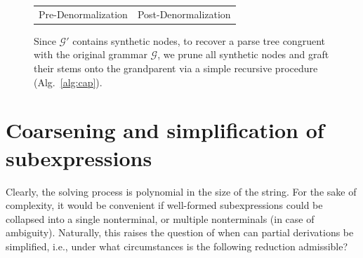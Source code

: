 \documentclass[sigplan,review,anonymous,acmsmall]{acmart}\settopmatter{printfolios=false,printccs=false,printacmref=false}
\begin{document}
\begin{figure}[H]
{\begin{tabular}{ll}
        \hspace{1cm}\Huge{Pre-Denormalization} & \hspace{2cm}\Huge{Post-Denormalization}
    \end{tabular}
  }
  \caption{Since $\mathcal{G}'$ contains synthetic nodes, to recover a parse tree congruent with the original grammar $\mathcal{G}$, we prune all synthetic nodes and graft their stems onto the grandparent via a simple recursive procedure (Alg.~\ref{alg:cap}).}%
\end{figure}

\section{Coarsening and simplification of subexpressions}

Clearly, the solving process is polynomial in the size of the string. For the sake of complexity, it would be convenient if well-formed subexpressions could be collapsed into a single nonterminal, or multiple nonterminals (in case of ambiguity). Naturally, this raises the question of when can partial derivations be simplified, i.e., under what circumstances is the following reduction admissible?
\end{document}

